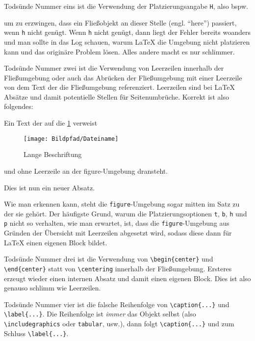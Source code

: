 Todsünde Nummer eins ist die Verwendung der Platzierungsangabe \texttt{H}, also
bspw.
\begin{latex}[caption={Verbot von \texttt{H} als Platzierungsangabe},label={lst:prohibited-h}]
\begin{figure}[H]
\end{figure}
\end{latex}
um zu erzwingen, dass ein Fließobjekt an dieser Stelle (engl. \enquote{here})
passiert, wenn \texttt{h} nicht genügt. Wenn \texttt{h} nicht genügt, dann liegt
der Fehler bereits woanders und man sollte in das Log schauen, warum LaTeX
die Umgebung nicht platzieren kann und das originäre Problem lösen. Alles andere
macht es nur schlimmer.

Todsünde Nummer zwei ist die Verwendung von Leerzeilen innerhalb der
Fließumgebung oder auch das Abrücken der Fließumgebung mit einer Leerzeile von
dem Text der die Fließumgebung referenziert. Leerzeilen sind bei LaTeX Absätze
und damit potentielle Stellen für Seitenumbrüche. Korrekt ist also folgendes:
\begin{latex}[caption={Verbot von Leerzeilen},label={lst:prohibited-blank-lines}]
Ein Text der auf die \cref{fig:my-fig} verweist
\begin{figure}[h]%
  \centering%
  \texttt{[image: Bildpfad/Dateiname]}%
  \caption[Kurzversion]{Lange Beschriftung}%
  \label{fig:my-fig}%
\end{figure}
und ohne Leerzeile an der figure-Umgebung dransteht.

Dies ist nun ein neuer Absatz.
\end{latex}
Wie man erkennen kann, steht die \texttt{figure}-Umgebung sogar mitten im Satz
zu der sie gehört. Der häufigste Grund, warum die Platzierungsoptionen
\texttt{t}, \texttt{b}, \texttt{h} und  \texttt{p} nicht so verhalten, wie
man erwartet, ist, dass die \texttt{figure}-Umgebung aus Gründen der Übersicht
mit Leerzeilen abgesetzt wird, sodass diese dann für LaTeX einen eigenen Block
bildet.

Todsünde Nummer drei ist die Verwendung von \verb#\begin{center}# und
\verb#\end{center}# statt von \verb#\centering# innerhalb der Fließumgebung.
Ersteres erzeugt wieder einen internen Absatz und damit einen eigenen Block.
Dies ist also genauso schlimm wie Leerzeilen.

Todsünde Nummer vier ist die falsche Reihenfolge von \verb#\caption{...}# und
\verb#\label{...}#. Die Reihenfolge ist \emph{immer} das Objekt selbst (also
\verb#\includegraphics# oder \verb#tabular#, usw.), dann folgt \verb#\caption{...}#
und zum Schluss \verb#\label{...}#.

